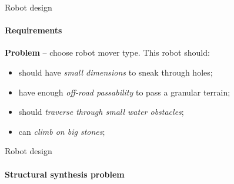 \documentclass[aspectratio=169]{beamer}
\begin{document}
\begin{frame}[t]{Robot design}
    \framesubtitle{Requirements}
    \Large
    \textbf{Problem} --  choose robot mover type. This robot should:
    \begin{itemize}
        \item should have \textit{small dimensions} to sneak through holes;
        \item have enough \textit{off-road passability} to pass a granular terrain;
        \item should \textit{traverse through small water obstacles};
        \item can \textit{climb on big stones};
    \end{itemize}
\end{frame}

\begin{frame}[t]{Robot design}
    \framesubtitle{Structural synthesis problem}
\end{frame}
\end{document}
